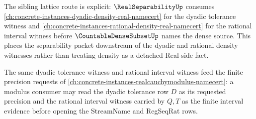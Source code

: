 The sibling lattice route is explicit: $\RealSeparabilityUp$ consumes \autoref{ch:concrete-instances-dyadic-density-real-namecert} for the dyadic tolerance witness and \autoref{ch:concrete-instances-rational-density-real-namecert} for the rational interval witness before $\CountableDenseSubsetUp$ names the dense source. This places the separability packet downstream of the dyadic and rational density witnesses rather than treating density as a detached Real-side fact.

The same dyadic tolerance witness and rational interval witness feed the finite precision requests of \autoref{ch:concrete-instances-realcauchymodulus-namecert}: a modulus consumer may read the dyadic tolerance row $D$ as its requested precision and the rational interval witness carried by $Q,T$ as the finite interval evidence before opening the StreamName and RegSeqRat rows.

